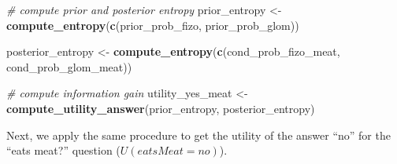 \documentclass[english,floatsintext,man]{apa6}
\newenvironment{Shaded}{\begin{snugshade}}{\end{snugshade}}
\newcommand{\KeywordTok}[1]{\textcolor[rgb]{0.13,0.29,0.53}{\textbf{#1}}}
\newcommand{\StringTok}[1]{\textcolor[rgb]{0.31,0.60,0.02}{#1}}
\newcommand{\CommentTok}[1]{\textcolor[rgb]{0.56,0.35,0.01}{\textit{#1}}}
\newcommand{\NormalTok}[1]{#1}
\theoremstyle{definition}
\theoremstyle{definition}
\theoremstyle{definition}
\theoremstyle{remark}
\begin{document}
\begin{Shaded}
\begin{Highlighting}[]
\CommentTok{# compute prior and posterior entropy}
\NormalTok{prior_entropy <-}\StringTok{ }\KeywordTok{compute_entropy}\NormalTok{(}\KeywordTok{c}\NormalTok{(prior_prob_fizo, }
\NormalTok{                                   prior_prob_glom))}

\NormalTok{posterior_entropy <-}\StringTok{ }\KeywordTok{compute_entropy}\NormalTok{(}\KeywordTok{c}\NormalTok{(cond_prob_fizo_meat, }
\NormalTok{                                       cond_prob_glom_meat))}

\CommentTok{# compute information gain}
\NormalTok{utility_yes_meat <-}\StringTok{ }\KeywordTok{compute_utility_answer}\NormalTok{(prior_entropy, }
\NormalTok{                                           posterior_entropy)}
\end{Highlighting}
\end{Shaded}

\noindent
Next, we apply the same procedure to get the utility of the answer
\enquote{no} for the \enquote{eats meat?} question
(\(U(eatsMeat = no)\)).
\end{document}
